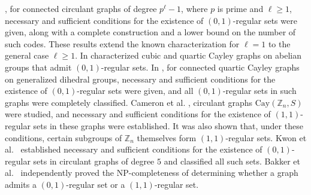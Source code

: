 \documentclass[12pt]{article}
\begin{document}
, for connected circulant graphs of degree $p^\ell-1$, where $p$ is prime and $\ell\geq 1$, necessary and sufficient conditions for the existence of $(0,1)$-regular sets  were given, along with a complete construction and a lower bound on the number of such codes. These results extend the known characterization for $\ell=1$ to the general case $\ell\geq 1$. In  \cite{CMO} characterized cubic and quartic Cayley graphs on abelian groups that admit $(0,1)$-regular  sets. In \cite{DYD}, for connected quartic Cayley graphs on generalized dihedral groups, necessary and sufficient conditions for the existence of $(0,1)$-regular sets were given, and all $(0,1)$-regular sets in such graphs were completely classified. Cameron et al. \cite{CYS}, circulant graphs $\mathrm{Cay}(\mathbb{Z}_n,S)$ were studied, and necessary and sufficient conditions for the existence of $(1,1)$-regular sets in these graphs were established. It was also shown that, under these conditions, certain subgroups of $\mathbb{Z}_n$ themselves form $(1,1)$-regular sets. Kwon et al.~\cite{kls} established necessary and sufficient conditions for the existence of $(0,1)$-regular sets in circulant graphs of degree $5$ and classified all such sets. Bakker et al.~\cite{Bakker} independently proved the NP-completeness of determining whether a graph admits a $(0,1)$-regular set or a $(1,1)$-regular set.
\end{document}
